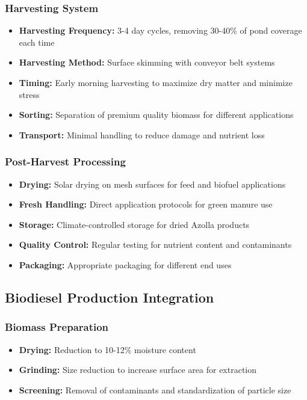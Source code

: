 \subsubsection{Harvesting System}
\begin{itemize}
    \item \textbf{Harvesting Frequency:} 3-4 day cycles, removing 30-40\% of pond coverage each time
    \item \textbf{Harvesting Method:} Surface skimming with conveyor belt systems
    \item \textbf{Timing:} Early morning harvesting to maximize dry matter and minimize stress
    \item \textbf{Sorting:} Separation of premium quality biomass for different applications
    \item \textbf{Transport:} Minimal handling to reduce damage and nutrient loss
\end{itemize}

\subsubsection{Post-Harvest Processing}
\begin{itemize}
    \item \textbf{Drying:} Solar drying on mesh surfaces for feed and biofuel applications
    \item \textbf{Fresh Handling:} Direct application protocols for green manure use
    \item \textbf{Storage:} Climate-controlled storage for dried Azolla products
    \item \textbf{Quality Control:} Regular testing for nutrient content and contaminants
    \item \textbf{Packaging:} Appropriate packaging for different end uses
\end{itemize}

\subsection{Biodiesel Production Integration}

\subsubsection{Biomass Preparation}
\begin{itemize}
    \item \textbf{Drying:} Reduction to 10-12\% moisture content
    \item \textbf{Grinding:} Size reduction to increase surface area for extraction
    \item \textbf{Screening:} Removal of contaminants and standardization of particle size
\end{itemize}

